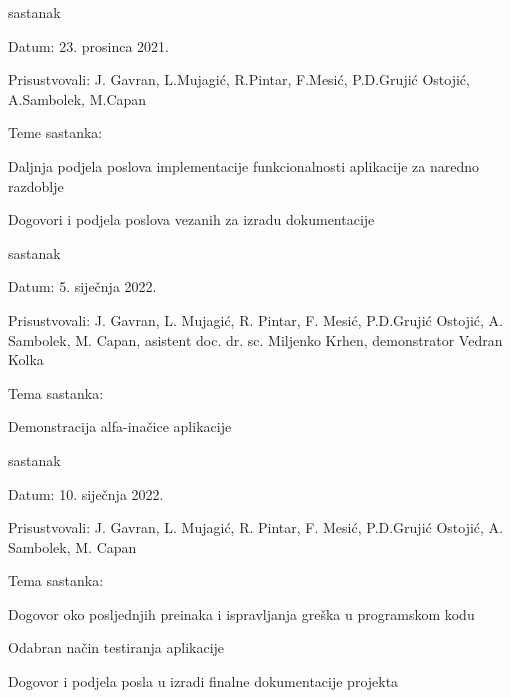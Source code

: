 \begin{packed_enum}
    		\item sastanak
    	\item[] \begin{packed_item}
    		\item Datum: 23. prosinca 2021.
    		\item Prisustvovali: J. Gavran, L.Mujagić, R.Pintar, F.Mesić, P.D.Grujić Ostojić, A.Sambolek, M.Capan
    		\item Teme sastanka:
    		\begin{packed_item}
    			\item Daljnja podjela poslova implementacije funkcionalnosti aplikacije za naredno razdoblje
    			\item Dogovori i podjela poslova vezanih za izradu dokumentacije
    		\end{packed_item}
    	\end{packed_item}
    
    		\item sastanak
    	\item[] \begin{packed_item}
    		\item Datum: 5. siječnja 2022.
    		\item Prisustvovali: J. Gavran, L. Mujagić, R. Pintar, F. Mesić, P.D.Grujić Ostojić, A. Sambolek, M. Capan, asistent doc. dr. sc. Miljenko Krhen, demonstrator Vedran Kolka
    		\item Tema sastanka:
    		\begin{packed_item}
    			\item Demonstracija alfa-inačice aplikacije
    		\end{packed_item}
    	\end{packed_item}

	\item sastanak
	\item[] \begin{packed_item}
    		\item Datum: 10. siječnja 2022.
    		\item Prisustvovali: J. Gavran, L. Mujagić, R. Pintar, F. Mesić, P.D.Grujić Ostojić, A. Sambolek, M. Capan
    		\item Tema sastanka:
    		\begin{packed_item}
    			\item Dogovor oko posljednjih preinaka i ispravljanja greška u programskom kodu
    			\item Odabran način testiranja aplikacije
    			\item  Dogovor i podjela posla u izradi finalne dokumentacije projekta
    		\end{packed_item}
    	\end{packed_item}

		\end{packed_enum}	
		
